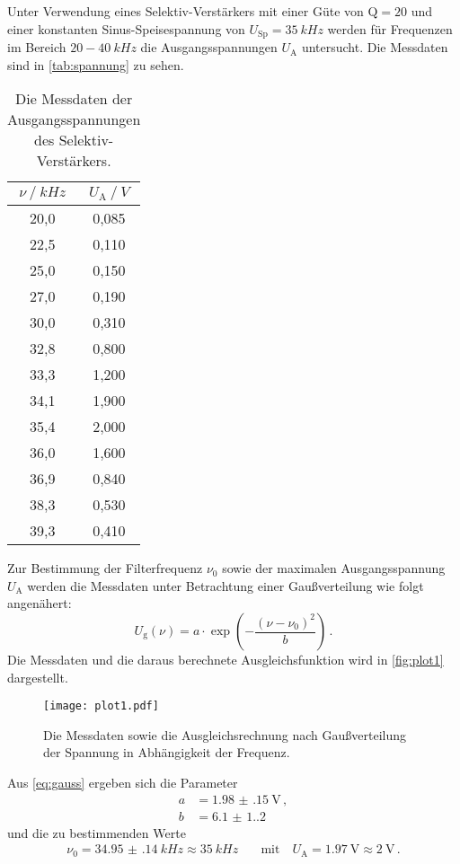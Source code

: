 Unter Verwendung eines Selektiv-Verstärkers mit einer Güte von $\text{Q} = 20$
und einer konstanten Sinus-Speisespannung von $U_\text{Sp} = \qty{35}{kHz}$ 
werden für Frequenzen im Bereich $20 - \qty{40}{kHz}$ die
Ausgangsspannungen $U_\text{A}$ untersucht.
Die Messdaten sind in \autoref{tab:spannung} zu sehen.
\begin{table}[H]
  \centering
  \caption{Die Messdaten der Ausgangsspannungen des Selektiv-Verstärkers.}
  \label{tab:spannung}
  \begin{tabular}{c c}
    \toprule
    $\nu \mathbin{/} \unit{kHz}$ & $U_\text{A} \mathbin{/} \unit{V}$ \\
    \midrule
      20,0 & 0,085 \\
      22,5 & 0,110 \\
      25,0 & 0,150 \\
      27,0 & 0,190 \\
      30,0 & 0,310 \\
      32,8 & 0,800 \\
      33,3 & 1,200 \\
      34,1 & 1,900 \\
      35,4 & 2,000 \\
      36,0 & 1,600 \\
      36,9 & 0,840 \\
      38,3 & 0,530 \\
      39,3 & 0,410 \\
    \bottomrule
  \end{tabular}
\end{table}

Zur Bestimmung der Filterfrequenz $\nu_\text{0}$ sowie der maximalen Ausgangsspannung $U_\text{A}$ 
werden die Messdaten unter Betrachtung einer Gaußverteilung wie folgt angenähert:
\begin{equation}\label{eq:gauss}
  U_\text{g}(\nu) = a \cdot \exp\left( -\frac{(\nu-\nu_\text{0})^2}{b} \right) \, .
\end{equation}
Die Messdaten und die daraus berechnete Ausgleichsfunktion wird in \autoref{fig:plot1} dargestellt.
\begin{figure}
  \centering
  \texttt{[image: plot1.pdf]}
  \caption{Die Messdaten sowie die Ausgleichsrechnung nach Gaußverteilung der Spannung in Abhängigkeit der Frequenz.}
  \label{fig:plot1}
\end{figure}
Aus \autoref{eq:gauss} ergeben sich die Parameter
\begin{align*}
  a &= \qty{1.98(15)}{\volt} \, ,\\
  b &= \num{6.1(1.2)} 
\end{align*}
und die zu bestimmenden Werte
\begin{align*}
  \nu_\text{0} = \qty{34.95(14)}{kHz} \approx \qty{35}{kHz} &\quad 
  \text{mit} \quad U_\text{A} = \qty{1.97}{\volt} \approx \qty{2}{\volt} \, .
\end{align*}

